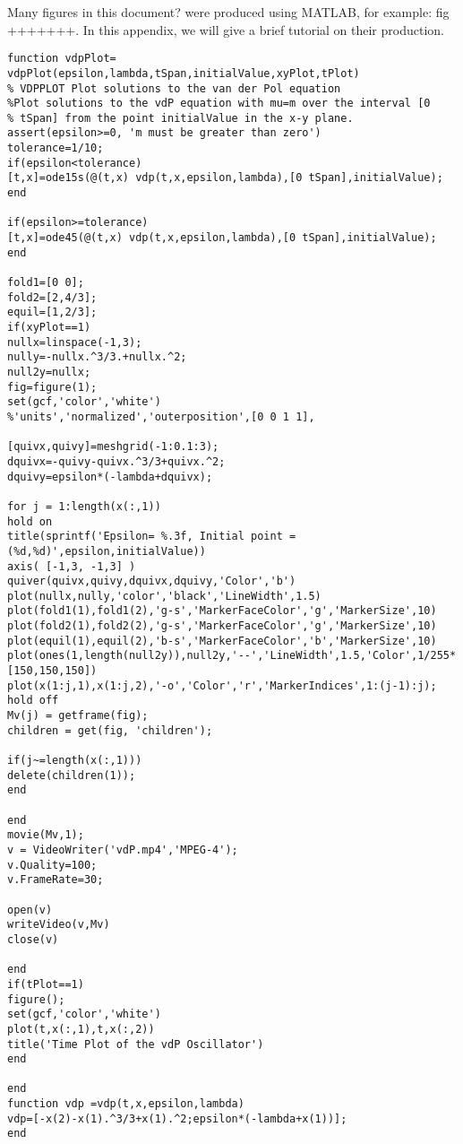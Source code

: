 
Many figures in this document? were produced using MATLAB, for example: fig +++++++. In this appendix, we will give a brief tutorial on their production.

\begin{lstlisting}[style=Matlab-editor]
function vdpPlot= vdpPlot(epsilon,lambda,tSpan,initialValue,xyPlot,tPlot)
% VDPPLOT Plot solutions to the van der Pol equation
%Plot solutions to the vdP equation with mu=m over the interval [0 
% tSpan] from the point initialValue in the x-y plane.
assert(epsilon>=0, 'm must be greater than zero')
tolerance=1/10;
if(epsilon<tolerance)
[t,x]=ode15s(@(t,x) vdp(t,x,epsilon,lambda),[0 tSpan],initialValue);
end

if(epsilon>=tolerance)
[t,x]=ode45(@(t,x) vdp(t,x,epsilon,lambda),[0 tSpan],initialValue);
end

fold1=[0 0];
fold2=[2,4/3];
equil=[1,2/3];
if(xyPlot==1)
nullx=linspace(-1,3);
nully=-nullx.^3/3.+nullx.^2;
null2y=nullx;
fig=figure(1);
set(gcf,'color','white')    
%'units','normalized','outerposition',[0 0 1 1],

[quivx,quivy]=meshgrid(-1:0.1:3);
dquivx=-quivy-quivx.^3/3+quivx.^2;
dquivy=epsilon*(-lambda+dquivx);

for j = 1:length(x(:,1))
hold on
title(sprintf('Epsilon= %.3f, Initial point =(%d,%d)',epsilon,initialValue))
axis( [-1,3, -1,3] )
quiver(quivx,quivy,dquivx,dquivy,'Color','b')
plot(nullx,nully,'color','black','LineWidth',1.5)
plot(fold1(1),fold1(2),'g-s','MarkerFaceColor','g','MarkerSize',10)
plot(fold2(1),fold2(2),'g-s','MarkerFaceColor','g','MarkerSize',10)
plot(equil(1),equil(2),'b-s','MarkerFaceColor','b','MarkerSize',10)
plot(ones(1,length(null2y)),null2y,'--','LineWidth',1.5,'Color',1/255*[150,150,150])
plot(x(1:j,1),x(1:j,2),'-o','Color','r','MarkerIndices',1:(j-1):j);
hold off
Mv(j) = getframe(fig);
children = get(fig, 'children');

if(j~=length(x(:,1)))
delete(children(1));
end 

end
movie(Mv,1);
v = VideoWriter('vdP.mp4','MPEG-4');
v.Quality=100;
v.FrameRate=30;

open(v)
writeVideo(v,Mv)
close(v)

end
if(tPlot==1)
figure();
set(gcf,'color','white')
plot(t,x(:,1),t,x(:,2))
title('Time Plot of the vdP Oscillator')
end

end
function vdp =vdp(t,x,epsilon,lambda)
vdp=[-x(2)-x(1).^3/3+x(1).^2;epsilon*(-lambda+x(1))];
end 




\end{lstlisting}
